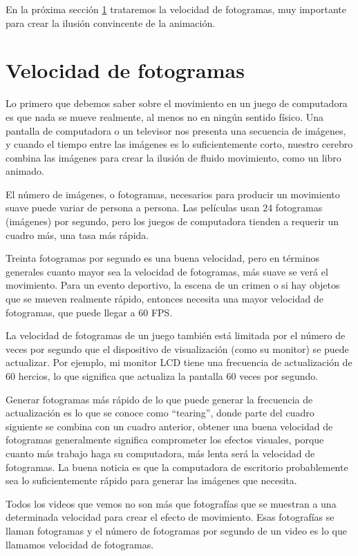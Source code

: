 {En la próxima sección \ref{fotograma} trataremos la  velocidad de fotogramas, muy importante para crear la ilusión convincente de la animación.


\section{Velocidad de fotogramas}\label{fotograma}

Lo primero que debemos saber sobre el movimiento en un juego de computadora es que nada se mueve realmente, al menos
no en ningún sentido físico. Una pantalla de computadora o un televisor nos presenta una secuencia de imágenes, y
cuando el tiempo entre las imágenes es lo suficientemente corto, nuestro cerebro combina las imágenes para crear la ilusión de fluido movimiento, como un libro animado. 

El número de imágenes, o fotogramas, necesarios para producir un movimiento suave puede variar
de persona a persona. Las películas usan 24 fotogramas (imágenes) por segundo, pero los juegos de computadora tienden a
requerir un cuadro más, una tasa más rápida. 

Treinta fotogramas por segundo es una buena velocidad, pero en términos generales cuanto mayor sea la velocidad de fotogramas, más suave se verá el movimiento. Para un evento deportivo, la escena de un crimen o si hay objetos que se mueven realmente rápido, entonces necesita una mayor velocidad de fotogramas, que puede llegar a 60 FPS.

La velocidad de fotogramas de un juego también está limitada por el número de veces por segundo que el dispositivo de visualización
(como su monitor) se puede actualizar. Por ejemplo, mi monitor LCD tiene una frecuencia de actualización de 60 hercios, lo que
significa que actualiza la pantalla 60 veces por segundo. 

Generar fotogramas más rápido de lo que puede generar la frecuencia de actualización es lo que se conoce como “tearing”, 
donde parte del cuadro siguiente se combina con un cuadro anterior, obtener una buena velocidad de fotogramas generalmente
significa comprometer los efectos visuales, porque cuanto más trabajo  haga su computadora, más lenta será la velocidad de fotogramas.
La buena noticia es que la computadora de escritorio probablemente sea lo suficientemente rápido para generar las imágenes que necesita.



Todos los videos que vemos no son más que fotografías que se muestran a una determinada velocidad para crear el efecto de movimiento. Esas fotografías se llaman fotogramas y el número de fotogramas por segundo de un video es lo que llamamos velocidad de fotogramas.

}
